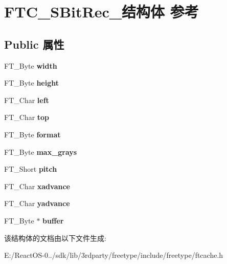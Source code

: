 \hypertarget{struct_f_t_c___s_bit_rec__}{}\section{F\+T\+C\+\_\+\+S\+Bit\+Rec\+\_\+结构体 参考}
\label{struct_f_t_c___s_bit_rec__}
\subsection*{Public 属性}
\begin{DoxyCompactItemize}
\item 
\mbox{\label{struct_f_t_c___s_bit_rec___a5b92fb4f213a880f758bb87ac2ceb263}} 
F\+T\+\_\+\+Byte {\bfseries width}
\item 
\mbox{\label{struct_f_t_c___s_bit_rec___a5953efe2aded3b184875d5e5d08cafef}} 
F\+T\+\_\+\+Byte {\bfseries height}
\item 
\mbox{\label{struct_f_t_c___s_bit_rec___aef273749f4fdb9943500ec6df8412a94}} 
F\+T\+\_\+\+Char {\bfseries left}
\item 
\mbox{\label{struct_f_t_c___s_bit_rec___a3e558b3a04b70f00f80b862cdc94d9a2}} 
F\+T\+\_\+\+Char {\bfseries top}
\item 
\mbox{\label{struct_f_t_c___s_bit_rec___a3d3fcc2869ce5c95f0f63898e6cef8be}} 
F\+T\+\_\+\+Byte {\bfseries format}
\item 
\mbox{\label{struct_f_t_c___s_bit_rec___a83958d4649a898312de9a7274550dff9}} 
F\+T\+\_\+\+Byte {\bfseries max\+\_\+grays}
\item 
\mbox{\label{struct_f_t_c___s_bit_rec___a1382ec014df599e706c2c1785bc18235}} 
F\+T\+\_\+\+Short {\bfseries pitch}
\item 
\mbox{\label{struct_f_t_c___s_bit_rec___a502a0bb69d973d2ae626a842eb9fefd3}} 
F\+T\+\_\+\+Char {\bfseries xadvance}
\item 
\mbox{\label{struct_f_t_c___s_bit_rec___aabe767ddaf7ff62918886c6f62e9ac28}} 
F\+T\+\_\+\+Char {\bfseries yadvance}
\item 
\mbox{\label{struct_f_t_c___s_bit_rec___abe4d78fc3f411d67e7fc43f7aa21bd1d}} 
F\+T\+\_\+\+Byte $\ast$ {\bfseries buffer}
\end{DoxyCompactItemize}


该结构体的文档由以下文件生成\+:\begin{DoxyCompactItemize}
\item 
E\+:/\+React\+O\+S-\/0../sdk/lib/3rdparty/freetype/include/freetype/ftcache.\+h\end{DoxyCompactItemize}
